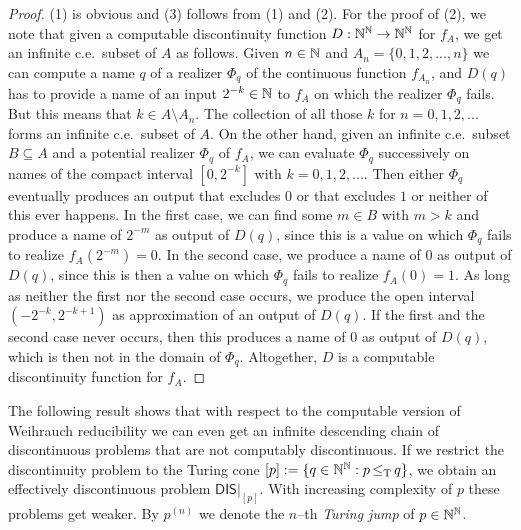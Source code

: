 \documentclass{amsart}
\def\IN{{\Bbb{N}}}
\def\In{\subseteq}
\def\leqT{\mathop{\leq_{\mathrm{T}}}}
\def\leqT{\mathop{\leq_{\mathrm{T}}}}
\def\DIS{\mathsf{DIS}}
\begin{document}
\begin{proof}
(1) is obvious and (3) follows from (1) and (2). For the proof of (2), we note that given a computable discontinuity function $D:\IN^\IN\to\IN^\IN$ for $f_A$, we get an infinite c.e.\ subset of $A$ as follows.
Given $n\in\IN$ and $A_n=\{0,1,2,...,n\}$ we can compute a name $q$ of a realizer $\Phi_q$ of the continuous
function $f_{A_n}$, and $D(q)$ has to provide a name of an input $2^{-k}\in\IN$ to $f_{A}$ on which the realizer $\Phi_q$ fails. 
But this means that $k\in A\setminus A_n$.  The collection of all those $k$ for $n=0,1,2,...$ forms an infinite c.e.\ subset of $A$. On the other hand, given an infinite c.e.\ subset $B\In A$ and a potential realizer $\Phi_q$ of $f_A$,
we can evaluate $\Phi_q$ successively on names of the compact interval $[0,2^{-k}]$ with $k=0,1,2,...$. Then either $\Phi_q$ eventually produces an output that excludes $0$ or that excludes $1$ or neither of this ever happens. In the first case, we can find some $m\in B$ with
$m>k$ and produce a name of $2^{-m}$ as output of $D(q)$, since this is a value on which $\Phi_q$ fails to realize $f_A(2^{-m})=0$.
In the second case, we produce a name of $0$ as output of $D(q)$, since this is then a value on which $\Phi_q$ fails to realize $f_A(0)=1$. As long as neither the first nor the second case occurs, we produce the open interval $(-2^{-k},2^{-k+1})$ as approximation of an output of $D(q)$. If the first and the second case never occurs, then this produces a name of $0$ as output of $D(q)$, which is then not in the domain of $\Phi_q$. Altogether, $D$ is a computable discontinuity function for $f_A$.
\end{proof}

The following result shows that with respect to the computable version of Weih\-rauch reducibility 
we can even get an infinite descending chain 
of discontinuous problems that are not computably discontinuous.
If we restrict the discontinuity problem to the Turing cone $[p]:=\{q\in\IN^\IN:p\leqT q\}$, 
we obtain an effectively discontinuous problem $\DIS|_{[p]}$. With increasing complexity of $p$ these problems get weaker.
By $p^{(n)}$ we denote the $n$--th {\em Turing jump} of $p\in\IN^\IN$.
\end{document}
